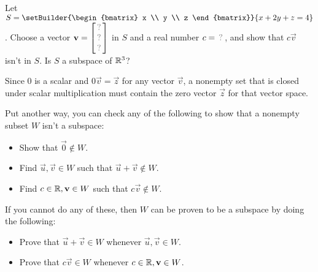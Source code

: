 \begin{activity}{10}
Let \(S=\setBuilder{\begin{bmatrix} x \\ y \\ z \end{bmatrix}}{ x+2y+z=4}\).
Choose a vector
\(\vec v=\begin{bmatrix} \unknown\\\unknown\\\unknown \end{bmatrix}\) in \(S\)
and a real number \(c=\unknown\), and show that \(c\vec v\) isn't in \(S\).
Is \(S\) a subspace of \(\mathbb{R}^3\)?
\end{activity}

\begin{remark}
Since \(0\) is a scalar and \(0\vec{v}=\vec{z}\) for any vector \(\vec{v}\), a
nonempty set that is closed under scalar multiplication must contain the zero vector
\(\vec{z}\) for that vector space.

\vspace{1em}

Put another way, you can check any of the following to show that a
nonempty subset \(W\) isn't a subspace:

\begin{itemize}
  \item Show that \(\vec 0\not\in W\). 
  \item Find \(\vec u,\vec v\in W\) such that \(\vec u+\vec v\not\in W\).
  \item Find \(c\in\mathbb{R},\mathbf v\in W\) such that \(c\vec v\not\in W\).
\end{itemize}

If you cannot do any of these, then \(W\) can be proven to be a subspace
by doing the following:
\begin{itemize}
  \item Prove that \(\vec u+\vec v\in W\) whenever \(\vec u,\vec v\in W\).
  \item Prove that \(c\vec v\in W\) whenever \(c\in\mathbb{R},\mathbf v\in W\).
\end{itemize}
\end{remark}

